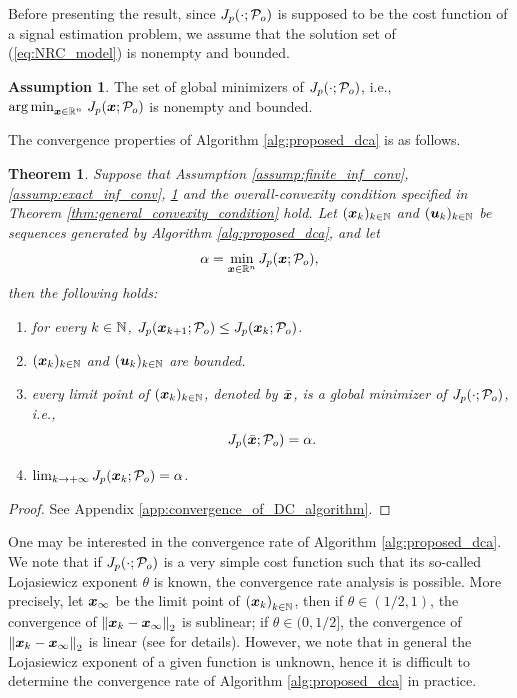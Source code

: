 \documentclass[lettersize,journal]{IEEEtran}
\theoremstyle{plain}%
\newtheorem{theorem}{Theorem}
\theoremstyle{definition}
\newtheorem{assumption}{Assumption}
\theoremstyle{remark}
\begin{document}
Before presenting the result, since $J_{p}(\cdot;\mathcal{P}_o)$ is supposed to be the cost function of a signal estimation problem, we assume that the solution set of (\ref{eq:NRC_model}) is nonempty and bounded.
\begin{assumption}\label{assump:boundedness_of_argmin}
The set of global minimizers of $J_{p}(\cdot;\mathcal{P}_o)$, i.e., $\mathrm{arg\,min}_{\bm{x}\in\mathbb{R}^n}\; J_{p}(\bm{x};\mathcal{P}_o)$ is nonempty and bounded.
\end{assumption}
The convergence properties of Algorithm \ref{alg:proposed_dca} is as follows.

\begin{theorem}\label{thm:convergence_of_dc_algorithm}
Suppose that Assumption \ref{assump:finite_inf_conv}, \ref{assump:exact_inf_conv}, \ref{assump:boundedness_of_argmin} and the overall-convexity condition specified in Theorem \ref{thm:general_convexity_condition} hold. Let $(\bm{x}_k)_{k\in\mathbb{N}}$ and $(\bm{u}_k)_{k\in\mathbb{N}}$ be sequences generated by Algorithm \ref{alg:proposed_dca}, and let
\[\alpha=\min_{\bm{x}\in\mathbb{R}^n}J_{p}(\bm{x};\mathcal{P}_o),\]
then the following holds:
\begin{enumerate}
\item for every $k\in\mathbb{N}$, $J_{p}(\bm{x}_{k+1};\mathcal{P}_o)\leq J_{p}(\bm{x}_k;\mathcal{P}_o)$.

\item $(\bm{x}_k)_{k\in\mathbb{N}}$ and $(\bm{u}_k)_{k\in\mathbb{N}}$ are bounded.

\item every limit point of $(\bm{x}_k)_{k\in\mathbb{N}}$, denoted by $\bar{\bm{x}}$, is a global minimizer of $J_{p}(\cdot;\mathcal{P}_o)$, i.e.,
\begin{equation*}
J_{p}(\bar{\bm{x}};\mathcal{P}_o)=\alpha.
\end{equation*}

\item $\lim_{k\to +\infty}J_{p}(\bm{x}_k;\mathcal{P}_o)=\alpha$.
\end{enumerate}
\end{theorem}
\begin{proof}
See Appendix \ref{app:convergence_of_DC_algorithm}.
\end{proof}

One may be interested in the convergence rate of Algorithm \ref{alg:proposed_dca}. We note that if $J_{p}(\cdot;\mathcal{P}_o)$ is a very simple cost function such that its so-called Lojasiewicz exponent $\theta$ is known, the convergence rate analysis is possible. More precisely, let $\bm{x}_\infty$ be the limit point of $\left( \bm{x}_k \right )_{k\in\mathbb{N}}$, then if $\theta\in(1/2,1)$, the convergence of $\left\| \bm{x}_k-\bm{x}_{\infty} \right\|_2$ is sublinear; if $\theta\in(0,1/2]$, the convergence of $\left\| \bm{x}_k-\bm{x}_{\infty} \right\|_2$ is linear (see \cite[Thm. 3.3]{le2018subanalytic} for details). However, we note that in general the Lojasiewicz exponent of a given function is unknown, hence it is difficult to determine the convergence rate of Algorithm \ref{alg:proposed_dca} in practice.
\end{document}
